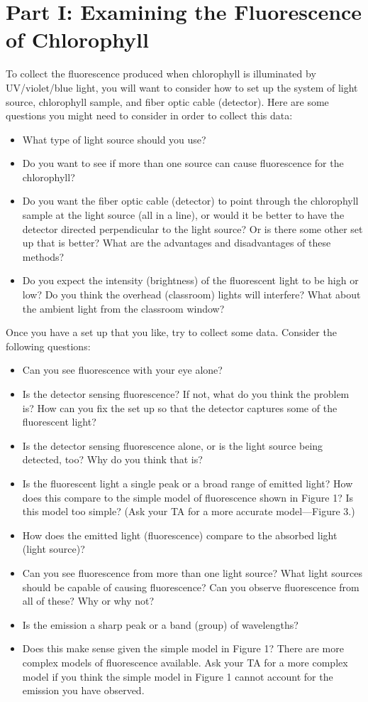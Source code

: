 \section*{Part I: Examining the Fluorescence of Chlorophyll}
To collect the fluorescence produced when chlorophyll is illuminated by UV/violet/blue
light, you will want to consider how to set up the system of light source, chlorophyll sample, and
fiber optic cable (detector). Here are some questions you might need to consider in order to collect
this data:

\begin{itemize}
\item What type of light source should you use?
\item Do you want to see if more than one source can cause fluorescence for the chlorophyll?
\item Do you want the fiber optic cable (detector) to point through the chlorophyll sample at the light source (all in a line), or would it be better to have the detector directed perpendicular to the light source? Or is there some other set up that is better? What are the advantages and disadvantages of these methods?
\item Do you expect the intensity (brightness) of the fluorescent light to be high or low? Do you think the overhead (classroom) lights will interfere? What about the ambient light from the classroom window?
\end{itemize}
Once you have a set up that you like, try to collect some data. Consider the following questions:
\begin{itemize}
\item Can you see fluorescence with your eye alone?
\item Is the detector sensing fluorescence? If not, what do you think the problem is? How can you fix the set up so that the detector captures some of the fluorescent light?
\item Is the detector sensing fluorescence alone, or is the light source being detected, too? Why do you think that is?
\item Is the fluorescent light a single peak or a broad range of emitted light? How does this compare to the simple model of fluorescence shown in Figure 1? Is this model too simple? (Ask your TA for a more accurate model—Figure 3.)
\item How does the emitted light (fluorescence) compare to the absorbed light (light source)?
\item Can you see fluorescence from more than one light source? What light sources should be capable of causing fluorescence? Can you observe fluorescence from all of these? Why or why not?
\item Is the emission a sharp peak or a band (group) of wavelengths?
\item Does this make sense given the simple model in Figure 1? There are more complex models of fluorescence available. Ask your TA for a more complex model if you think the simple model in Figure 1 cannot account for the emission you have observed.
\end{itemize}

